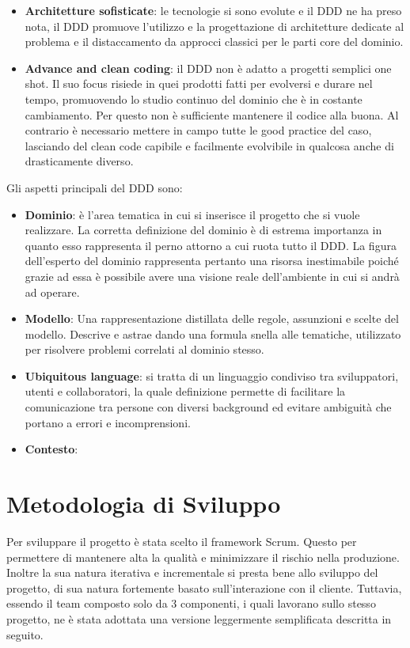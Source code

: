 \begin{itemize}
        \item \textbf{Architetture sofisticate}: le tecnologie si sono evolute e il DDD ne ha preso nota, il DDD promuove l'utilizzo e la progettazione di architetture dedicate al problema e il distaccamento da approcci classici per le parti core del dominio.
        
        \item \textbf{Advance and clean coding}: il DDD non è adatto a progetti semplici one shot. Il suo focus risiede in quei prodotti fatti per evolversi e durare nel tempo, promuovendo lo studio continuo del dominio che è in costante cambiamento. Per questo non è sufficiente mantenere il codice alla buona. Al contrario è necessario mettere in campo tutte le good practice del caso, lasciando del clean code capibile e facilmente evolvibile in qualcosa anche di drasticamente diverso. 
        
        
    \end{itemize}
    
    
    
    Gli aspetti principali del DDD sono:
    \begin{itemize}
        \item \textbf{Dominio}: è l'area tematica in cui si inserisce il progetto che si vuole realizzare. La corretta definizione del dominio è di estrema importanza in quanto esso rappresenta il perno attorno a cui ruota tutto il DDD. La figura dell'esperto del dominio rappresenta pertanto una risorsa inestimabile poiché grazie ad essa è possibile avere una visione reale dell'ambiente in cui si andrà ad operare. 
        \item \textbf{Modello}: Una rappresentazione distillata delle regole, assunzioni e scelte del modello. Descrive e astrae dando una formula snella alle tematiche, utilizzato per risolvere problemi correlati al dominio stesso.
        \item \textbf{Ubiquitous language}: si tratta di un linguaggio condiviso tra sviluppatori, utenti e collaboratori, la quale definizione permette di facilitare la comunicazione tra persone con diversi background ed evitare ambiguità che portano a errori e incomprensioni.
        \item \textbf{Contesto}: %
    \end{itemize}

\section{Metodologia di Sviluppo}
Per sviluppare il progetto è stata scelto il framework Scrum. Questo per permettere di mantenere alta la qualità e minimizzare il rischio nella produzione. Inoltre la sua natura iterativa e incrementale si presta bene allo sviluppo del progetto, di sua natura fortemente basato sull'interazione con il cliente. Tuttavia, essendo il team composto solo da 3 componenti, i quali lavorano sullo stesso progetto, ne è stata adottata una versione leggermente semplificata descritta in seguito. 
